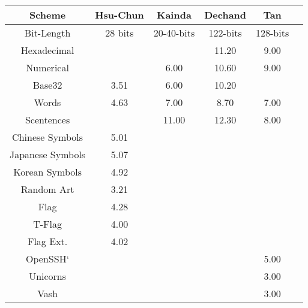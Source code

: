 \begin{tabular}{c|ccccc}
    \toprule
    \textbf{Scheme} 
    & Hsu-Chun\cite{hsiao2009study}      
    & Kainda\cite{kainda2009usability}      
    & Dechand\cite{dechand2016empirical}
    & Tan\cite{tan2017can}      
    \\\hline
    Bit-Length      & 28 bits   & 20-40-bits & 122-bits & 128-bits
    \\\hline
    Hexadecimal     &           &           & 11.20   & 9.00\\
    Numerical       &           & 6.00      & 10.60   & 9.00\\
    Base32          & 3.51      & 6.00      & 10.20   & \\
    Words           & 4.63      & 7.00      & 8.70    & 7.00 \\
    Scentences      &           & 11.00     & 12.30   & 8.00 \\
    Chinese Symbols & 5.01   &           &         & \\
    Japanese Symbols& 5.07   &           &         & \\
    Korean Symbols  & 4.92   &           &         & \\
    \midrule
    Random Art	     & 3.21   &&&&\\
    Flag    	     & 4.28   &&&&\\
    T-Flag  	     & 4.00   &&&&\\
    Flag Ext.	     & 4.02   &&&&\\
    OpenSSH`         &&&& 5.00 &\\
    Unicorns         &&&& 3.00 &\\
    Vash             &&&& 3.00 &\\
    \bottomrule
\end{tabular}